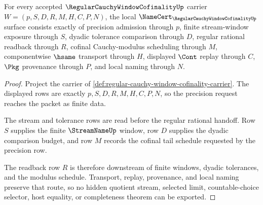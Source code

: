 \begin{theorem}
\label{thm:regular-cauchy-window-cofinality-namecert-obligations}
For every accepted $\RegularCauchyWindowCofinalityUp$ carrier $W=(p,S,D,R,M,H,C,P,N)$, the local $\NameCert_{\RegularCauchyWindowCofinalityUp}$ surface consists exactly of precision admission through $p$, finite stream-window exposure through $S$, dyadic tolerance comparison through $D$, regular rational readback through $R$, cofinal Cauchy-modulus scheduling through $M$, componentwise $\hsame$ transport through $H$, displayed $\Cont$ replay through $C$, $\Pkg$ provenance through $P$, and local naming through $N$.
\end{theorem}
\begin{proof}
Project the carrier of \autoref{def:regular-cauchy-window-cofinality-carrier}. The displayed rows are exactly $p,S,D,R,M,H,C,P,N$, so the precision request reaches the packet as finite data.

The stream and tolerance rows are read before the regular rational handoff. Row $S$ supplies the finite $\StreamNameUp$ window, row $D$ supplies the dyadic comparison budget, and row $M$ records the cofinal tail schedule requested by the precision row.

The readback row $R$ is therefore downstream of finite windows, dyadic tolerances, and the modulus schedule. Transport, replay, provenance, and local naming preserve that route, so no hidden quotient stream, selected limit, countable-choice selector, host equality, or completeness theorem can be exported.
\end{proof}

